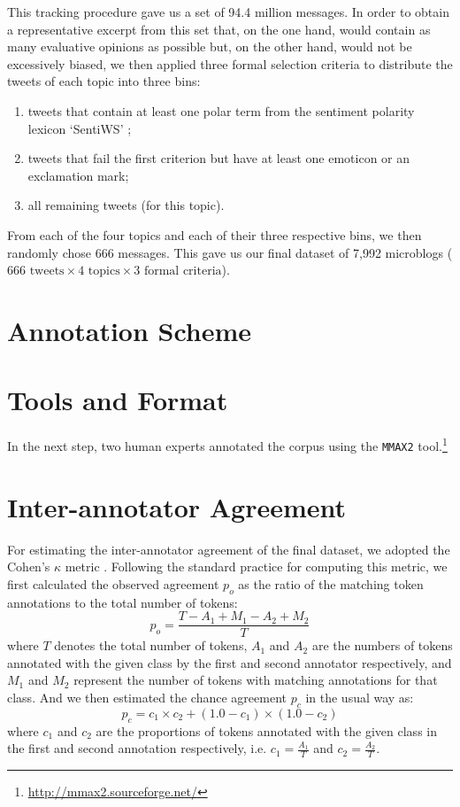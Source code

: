This tracking procedure gave us a set of 94.4 million messages.  In
order to obtain a representative excerpt from this set that, on the
one hand, would contain as many evaluative opinions as possible but,
on the other hand, would not be excessively biased, we then applied
three formal selection criteria to distribute the tweets of each topic
into three bins:
\begin{enumerate}
\item tweets that
  contain at least one polar term from the sentiment polarity
  lexicon `SentiWS' \cite{Remus:10};
\item tweets that fail the first criterion but have at
  least one emoticon or an exclamation mark;
\item all remaining tweets (for this topic).
\end{enumerate}

From each of the four topics and each of their three respective bins,
we then randomly chose 666 messages. This gave us our final dataset of
7,992 microblogs ($666\text{ tweets} \times 4\text{ topics} \times
3\text{ formal criteria}$).

\section{Annotation Scheme}\label{sec:ascheme}

\section{Tools and Format}\label{sec:tformat}
In the next step, two human experts annotated the corpus using the
\texttt{MMAX2} tool.\footnote{\url{http://mmax2.sourceforge.net/}}

\section{Inter-annotator Agreement}\label{sec:iaa}
For estimating the inter-annotator agreement of the final dataset, we
adopted the Cohen's $\kappa$ metric \cite{Cohen:60}.  Following the
standard practice for computing this metric, we first calculated the
observed agreement $p_o$ as the ratio of the matching token
annotations to the total number of tokens:
\begin{equation*}\textstyle
  p_o = \frac{T - A_1 + M_1 - A_2 + M_2}{T}
\end{equation*}
where $T$ denotes the total number of tokens, $A_1$ and $A_2$ are the
numbers of tokens annotated with the given class by the first and
second annotator respectively, and $M_1$ and $M_2$ represent the
number of tokens with matching annotations for that class.  And we
then estimated the chance agreement $p_c$ in the usual way as:
\begin{equation*}\textstyle
  p_c = c_1 \times c_2 + (1.0 - c_1) \times (1.0 - c_2)
\end{equation*}
where $c_1$ and $c_2$ are the proportions of tokens annotated with the
given class in the first and second annotation respectively, i.e. $c_1
= \frac{A_1}{T}$ and $c_2 = \frac{A_2}{T}$.

